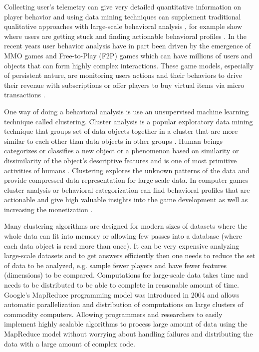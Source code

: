 Collecting user's telemetry can give very detailed quantitative information on player behavior and using data mining techniques can supplement traditional qualitative approaches with large-scale behavioral analysis \citep{Yannakakis:2012}, for example show where users are getting stuck and finding actionable behavioral profiles \citep{Kim:2008Tracking, Drachen:2012, Drachen:2011Evaluating}. In the recent years user behavior analysis have in part been driven by the emergence of MMO games and Free-to-Play (F2P) games which can have millions of users and objects that can form highly complex interactions. These game models, especially of persistent nature, are monitoring users actions and their behaviors to drive their revenue with subscriptions or offer players to buy virtual items via micro transactions \citep{Kim:2008Tracking, Drachen:2011Evaluating, Fields:2011SocialGame, Seif:2013GameAnalytics}. 

One way of doing a behavioral analysis is use an unsupervised machine learning technique called clustering. Cluster analysis is a popular exploratory data mining technique that groups set of data objects together in a cluster that are more similar to each other than data objects in other groups \citep{Xu:2005Clustering}. Human beings categorizes or classifies a new object or a phenomenon based on similarity or dissimilarity of the object's descriptive features and is one of most primitive activities of humans \citep{Anderberg:1973ClusterAnalysis}. Clustering explores the unknown patterns of the data and provide compressed data representation for large-scale data. In computer games cluster analysis or behavioral categorization can find behavioral profiles that are actionable and give high valuable insights into the game development as well as increasing the monetization \cite{Drachen:2009Tomb, Mahlmann:2010Tomb}. 

Many clustering algorithms are designed for modern sizes of datasets where the whole data can fit into memory or allowing few passes into a database (where each data object is read more than once). It can be very expensive analyzing large-scale datasets and to get answers efficiently then one needs to reduce the set of data to be analyzed, e.g. sample fewer players and have fewer features (dimensions) to be compared. Computations for large-scale data takes time and needs to be distributed to be able to complete in reasonable amount of time. Google's MapReduce programming model was introduced in 2004 \citep{Dean:2004} and allows automatic parallelization and distribution of computations on large clusters of commodity computers. Allowing programmers and researchers to easily implement highly scalable algorithms to process large amount of data using the MapReduce model without worrying about handling failures and distributing the data with a large amount of complex code. 


